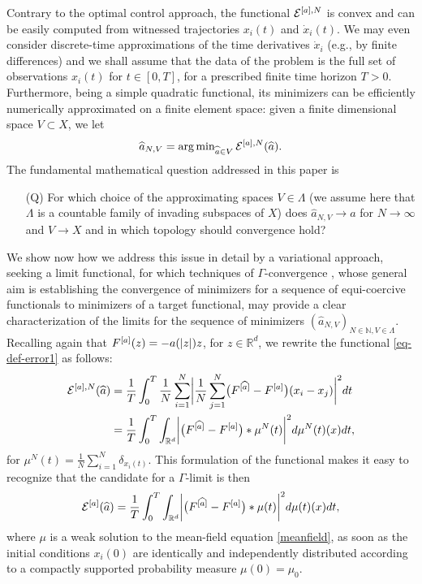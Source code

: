 Contrary to the optimal control approach, the functional $\mathcal E^{[a],N}$ is convex and can be easily computed from witnessed trajectories $x_i(t)$ and $\dot x_i(t)$. We may even consider discrete-time approximations of the time derivatives $\dot x_i$ (e.g., by finite differences) and we shall assume that the data of the problem is the full set of observations $x_i(t)$ for $t \in [0,T]$, for a prescribed finite time horizon $T>0$. Furthermore, being a simple quadratic functional, its minimizers can be efficiently numerically approximated on a finite element space: given a finite dimensional space $V \subset X$, we let
\begin{equation}\label{fdproxy}
\widehat a_{N,V} = \operatorname{arg\,min}_{\widehat a \in V} \mathcal E^{[a],N}(\widehat a).
\end{equation}
The fundamental mathematical question addressed in this paper is
\begin{itemize}
\item[(Q)] For which choice of the approximating spaces $V \in \Lambda$ (we assume here that $\Lambda$ is a countable family of invading subspaces of $X$) does $\widehat a_{N,V} \to a$ for $N \to \infty$ and $V \to X$ and in which topology should convergence hold?
\end{itemize}
We show now how we address this issue in detail by a variational approach, seeking a limit functional, for which techniques of $\Gamma$-convergence \cite{MR1201152}, whose general aim is establishing the convergence of minimizers for a sequence of equi-coercive functionals to minimizers of a target functional, may provide a clear characterization of the limits for the sequence of minimizers $(\widehat a_{N,V})_{N \in \mathbb N, V \in \Lambda}$.
Recalling again that $F^{[a]}(z) =-a(| z |)z$, for $z \in \mathbb R^{d}$, we rewrite the functional \eqref{eq-def-error1} as follows:
\begin{align}\label{pirlo}
	\begin{split}
	\mathcal E^{[a],N}(\widehat a) & = \frac{1}{T}\int_0^T\frac{1}{N}\sum_{i=1}^N\biggl|\frac{1}{N}\sum_{j=1}^N
			\bigl(F^{[\widehat a]}-F^{[a]}\bigr)(x_i-x_j)\biggr|^2 dt\\
			& = \frac{1}{T}\int_0^T \int_{\mathbb{R}^d} \biggl|\bigl(F^{[\widehat a]}-F^{[a]}\bigr)\ast\mu^N(t)\biggr|^2d\mu^N(t)(x)dt,
	\end{split}
\end{align}
for $\mu^N(t) = \frac{1}{N}\sum^N_{i = 1} \delta_ {x_i(t)}$.
This formulation of the functional makes it easy to recognize that the candidate for a $\Gamma$-limit  is then
\begin{align}\label{ourfunctional}
	\mathcal E^{[a]}(\widehat a)=\frac{1}{T}\int_0^T \int_{\mathbb{R}^d} \biggl|\bigl(F^{[\widehat a]}-F^{[a]}\bigr)\ast\mu(t)\biggr|^2d\mu(t)(x)dt,
\end{align}
where $\mu$ is a weak solution to the mean-field equation \eqref{meanfield}, as soon as the initial conditions $x_i(0)$ are identically and independently 
distributed according to a compactly supported probability measure $\mu(0)=\mu_0$. 

